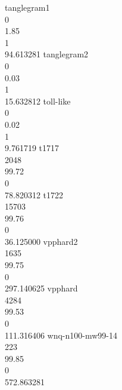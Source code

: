 tanglegram1 \\ 0 \\ 1.85 \\ 1 \\ 94.613281
tanglegram2 \\ 0 \\ 0.03 \\ 1 \\ 15.632812
toll-like \\ 0 \\ 0.02 \\ 1 \\ 9.761719
t1717 \\ 2048 \\ 99.72 \\ 0 \\ 78.820312
t1722 \\ 15703 \\ 99.76 \\ 0 \\ 36.125000
vpphard2 \\ 1635 \\ 99.75 \\ 0 \\ 297.140625
vpphard \\ 4284 \\ 99.53 \\ 0 \\ 111.316406
wnq-n100-mw99-14 \\ 223 \\ 99.85 \\ 0 \\ 572.863281



